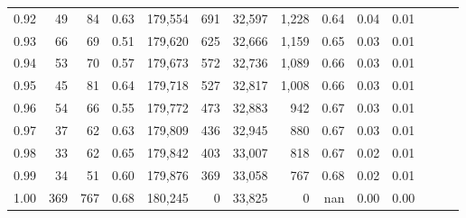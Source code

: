 \begin{tabular}{rrrrrrrrrrrrrr}
0.92 &     49 &   84 &  0.63 &  179,554 &      691 &  32,597 &   1,228 &  0.64 &  0.04 &      0.01 \\
0.93 &     66 &   69 &  0.51 &  179,620 &      625 &  32,666 &   1,159 &  0.65 &  0.03 &      0.01 \\
0.94 &     53 &   70 &  0.57 &  179,673 &      572 &  32,736 &   1,089 &  0.66 &  0.03 &      0.01 \\
0.95 &     45 &   81 &  0.64 &  179,718 &      527 &  32,817 &   1,008 &  0.66 &  0.03 &      0.01 \\
0.96 &     54 &   66 &  0.55 &  179,772 &      473 &  32,883 &     942 &  0.67 &  0.03 &      0.01 \\
0.97 &     37 &   62 &  0.63 &  179,809 &      436 &  32,945 &     880 &  0.67 &  0.03 &      0.01 \\
0.98 &     33 &   62 &  0.65 &  179,842 &      403 &  33,007 &     818 &  0.67 &  0.02 &      0.01 \\
0.99 &     34 &   51 &  0.60 &  179,876 &      369 &  33,058 &     767 &  0.68 &  0.02 &      0.01 \\
1.00 &    369 &  767 &  0.68 &  180,245 &        0 &  33,825 &       0 &   nan &  0.00 &      0.00 \\
\bottomrule
\end{tabular}
